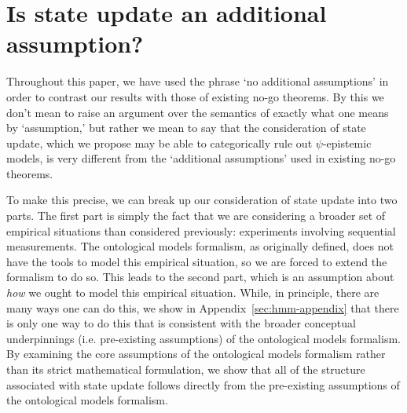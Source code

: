 \documentclass[%
 reprint, onecolumn, 12pt,
superscriptaddress,
nofootinbib,
 prx, 
]{quantumarticle}
\begin{document}
 
%  


\clearpage

\appendix

\section{Is state update an additional assumption?}
\label{sec:additional-assumption}

Throughout this paper, we have used the phrase `no additional
assumptions' in order to contrast our results with those of existing
no-go theorems. By this we don't mean to raise an argument over the
semantics of exactly what one means by `assumption,' but rather we
mean to say that the consideration of state update, which we propose
may be able to categorically rule out $\psi$-epistemic models, is very
different from the `additional assumptions' used in existing no-go
theorems.

To make this precise, we can break up our consideration of state
update into two parts. The first part is simply the fact that we are
considering a broader set of empirical situations than considered
previously: experiments involving sequential measurements. The
ontological models formalism, as originally defined, does not have the
tools to model this empirical situation, so we are forced to extend
the formalism to do so. This leads to the second part, which is an
assumption about \emph{how} we ought to model this empirical
situation. While, in principle, there are many ways one can do this,
we show in Appendix~\ref{sec:hmm-appendix} that there is only one way
to do this that is consistent with the broader conceptual
underpinnings (i.e. pre-existing assumptions) of the ontological
models formalism. By examining the core assumptions of the ontological
models formalism rather than its strict mathematical formulation, we
show that all of the structure associated with state update follows
directly from the pre-existing assumptions of the ontological models
formalism.
\end{document}
